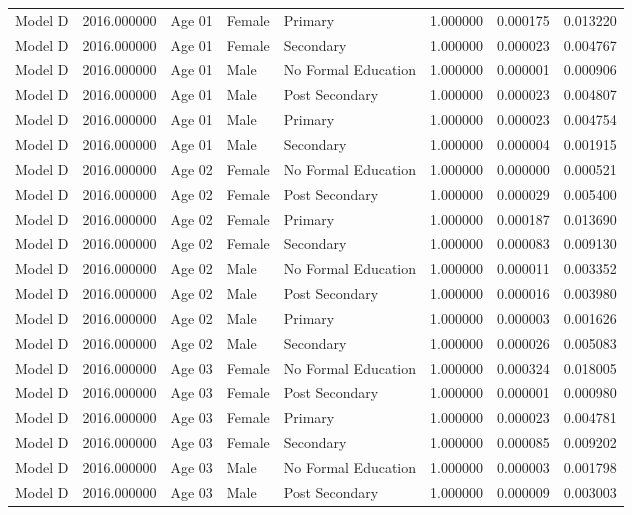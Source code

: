 \begin{table}[ht]
\begin{tabular}{lrlllrrr}
Model D & 2016.000000 & Age 01 & Female & Primary & 1.000000 & 0.000175 & 0.013220 \\
Model D & 2016.000000 & Age 01 & Female & Secondary & 1.000000 & 0.000023 & 0.004767 \\
Model D & 2016.000000 & Age 01 & Male & No Formal Education & 1.000000 & 0.000001 & 0.000906 \\
Model D & 2016.000000 & Age 01 & Male & Post Secondary & 1.000000 & 0.000023 & 0.004807 \\
Model D & 2016.000000 & Age 01 & Male & Primary & 1.000000 & 0.000023 & 0.004754 \\
Model D & 2016.000000 & Age 01 & Male & Secondary & 1.000000 & 0.000004 & 0.001915 \\
Model D & 2016.000000 & Age 02 & Female & No Formal Education & 1.000000 & 0.000000 & 0.000521 \\
Model D & 2016.000000 & Age 02 & Female & Post Secondary & 1.000000 & 0.000029 & 0.005400 \\
Model D & 2016.000000 & Age 02 & Female & Primary & 1.000000 & 0.000187 & 0.013690 \\
Model D & 2016.000000 & Age 02 & Female & Secondary & 1.000000 & 0.000083 & 0.009130 \\
Model D & 2016.000000 & Age 02 & Male & No Formal Education & 1.000000 & 0.000011 & 0.003352 \\
Model D & 2016.000000 & Age 02 & Male & Post Secondary & 1.000000 & 0.000016 & 0.003980 \\
Model D & 2016.000000 & Age 02 & Male & Primary & 1.000000 & 0.000003 & 0.001626 \\
Model D & 2016.000000 & Age 02 & Male & Secondary & 1.000000 & 0.000026 & 0.005083 \\
Model D & 2016.000000 & Age 03 & Female & No Formal Education & 1.000000 & 0.000324 & 0.018005 \\
Model D & 2016.000000 & Age 03 & Female & Post Secondary & 1.000000 & 0.000001 & 0.000980 \\
Model D & 2016.000000 & Age 03 & Female & Primary & 1.000000 & 0.000023 & 0.004781 \\
Model D & 2016.000000 & Age 03 & Female & Secondary & 1.000000 & 0.000085 & 0.009202 \\
Model D & 2016.000000 & Age 03 & Male & No Formal Education & 1.000000 & 0.000003 & 0.001798 \\
Model D & 2016.000000 & Age 03 & Male & Post Secondary & 1.000000 & 0.000009 & 0.003003 \\

\end{tabular}
\end{table}

